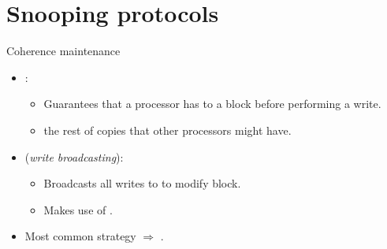\section{Snooping protocols}

\begin{frame}[t]{Coherence maintenance}
\begin{itemize}
  \item {}:
    \begin{itemize}
      \item Guarantees that a processor has  
            to a block before performing a write.
      \item {} the rest of copies that other processors might have.
    \end{itemize}

  \item {} (\emph{write broadcasting}):
    \begin{itemize}
      \item Broadcasts all writes to  to modify block.
      \item Makes use of .
    \end{itemize}

  \item Most common strategy $\Rightarrow$ .
\end{itemize}
\end{frame}

